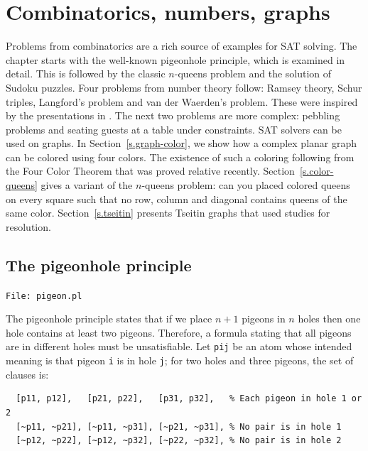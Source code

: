 \documentclass[11pt]{report}
\newcommand*{\p}[1]{\textup{\texttt{#1}}}
\newcommand*{\fl}[1]{\parbox{\textwidth}{\raggedleft \p{File: #1}}}
\begin{document}
\clearpage


\chapter{Combinatorics, numbers, graphs}\label{ch.comb}

Problems from combinatorics are a rich source of examples for SAT solving. The chapter starts with the well-known pigeonhole principle, which is examined in detail. This is followed by the classic $n$-queens problem and the solution of Sudoku puzzles. Four problems from number theory follow: Ramsey theory, Schur triples, Langford's problem and van der Waerden's problem. These were inspired by the presentations in \cite{brute,knuth-sat}. The next two problems are more complex: pebbling problems and seating guests at a table under constraints. SAT solvers can be used on graphs. In Section~\ref{s.graph-color}, we show how a complex planar graph can be colored using four colors. The existence of such a coloring following from the Four Color Theorem that was proved relative recently. Section~\ref{s.color-queens} gives a variant of the $n$-queens problem: can you placed colored queens on every square such that no row, column and diagonal contains queens of the same color. Section~\ref{s.tseitin} presents Tseitin graphs that used studies for resolution.



\section{The pigeonhole principle}\label{ch.pigeon}

\fl{pigeon.pl}

The pigeonhole principle states that if we place $n+1$ pigeons in $n$
holes then one hole contains at least two pigeons. Therefore, a formula
stating that all pigeons are in different holes must be unsatisfiable.
Let \p{pij} be an atom whose intended meaning is that pigeon \p{i} is in
hole \p{j}; for two holes and three pigeons, the set of clauses is:

\begin{verbatim}
  [p11, p12],   [p21, p22],   [p31, p32],   % Each pigeon in hole 1 or 2 
  [~p11, ~p21], [~p11, ~p31], [~p21, ~p31], % No pair is in hole 1
  [~p12, ~p22], [~p12, ~p32], [~p22, ~p32], % No pair is in hole 2
\end{verbatim}
\end{document}
